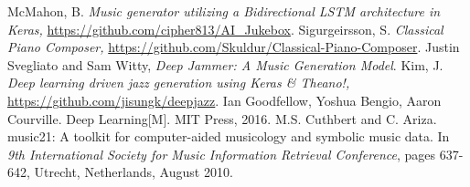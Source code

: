 \documentclass[conference]{IEEEtran}
\begin{document}
\begin{thebibliography}{00}
 McMahon, B. \textit{Music generator utilizing a Bidirectional LSTM architecture in Keras,} \url{https://github.com/cipher813/AI_Jukebox}.
 Sigurgeirsson, S. \textit{Classical Piano Composer,} \url{https://github.com/Skuldur/Classical-Piano-Composer}.
 Justin Svegliato and Sam Witty, \textit{Deep Jammer: A Music Generation Model}.
 Kim, J. \textit{Deep learning driven jazz generation using Keras \& Theano!,} \url{https://github.com/jisungk/deepjazz}.
 Ian Goodfellow, Yoshua Bengio, Aaron Courville. Deep Learning[M]. MIT Press, 2016.
 M.S. Cuthbert and C. Ariza. music21: A toolkit for computer-aided musicology and symbolic music data. In \textit{9th International Society for Music Information Retrieval Conference}, pages 637-642, Utrecht, Netherlands, August 2010.
\end{thebibliography}
\vspace{12pt}
\end{document}
